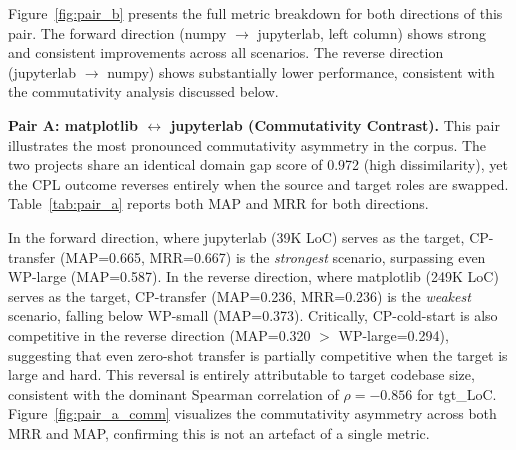 \documentclass[12pt,table,xcdraw]{article}
\begin{document}
Figure~\ref{fig:pair_b} presents the full metric breakdown for both directions of this pair. The forward direction (numpy $\rightarrow$ jupyterlab, left column) shows strong and consistent improvements across all scenarios. The reverse direction (jupyterlab $\rightarrow$ numpy) shows substantially lower performance, consistent with the commutativity analysis discussed below.

\textbf{Pair A: matplotlib $\leftrightarrow$ jupyterlab (Commutativity Contrast).} This pair illustrates the most pronounced commutativity asymmetry in the corpus. The two projects share an identical domain gap score of 0.972 (high dissimilarity), yet the CPL outcome reverses entirely when the source and target roles are swapped. Table~\ref{tab:pair_a} reports both MAP and MRR for both directions.

\begin{table}[h]
\centering
\caption{Pair A: asymmetric CPL performance — both MAP and MRR, both directions.}
\label{tab:pair_a}
\end{table}

In the forward direction, where jupyterlab (39K LoC) serves as the target, CP-transfer (MAP=0.665, MRR=0.667) is the \textit{strongest} scenario, surpassing even WP-large (MAP=0.587). In the reverse direction, where matplotlib (249K LoC) serves as the target, CP-transfer (MAP=0.236, MRR=0.236) is the \textit{weakest} scenario, falling below WP-small (MAP=0.373). Critically, CP-cold-start is also competitive in the reverse direction (MAP=0.320 $>$ WP-large=0.294), suggesting that even zero-shot transfer is partially competitive when the target is large and hard. This reversal is entirely attributable to target codebase size, consistent with the dominant Spearman correlation of $\rho = -0.856$ for tgt\_LoC. Figure~\ref{fig:pair_a_comm} visualizes the commutativity asymmetry across both MRR and MAP, confirming this is not an artefact of a single metric.
\end{document}
